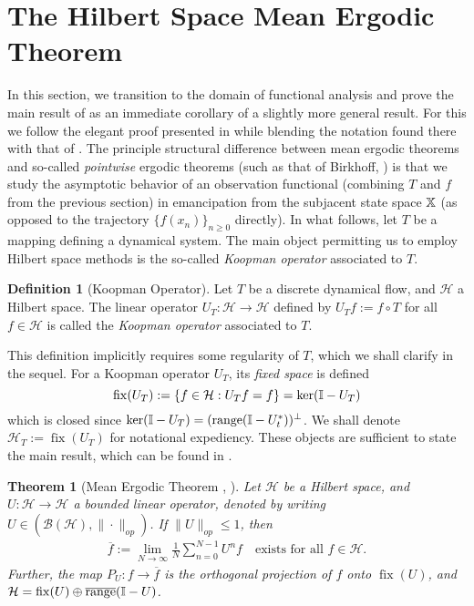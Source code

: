 \documentclass[11pt]{report}
\newcommand{\mc}[1]{\mathcal{#1}}
\DeclareMathOperator{\fix}{fix}
\DeclareMathOperator{\ran}{range}
\newtheorem{theorem}{Theorem}[section]
\theoremstyle{definition}
\newtheorem{definition}{Definition}
\begin{document}
    \section{The Hilbert Space Mean Ergodic Theorem}\label{sec2}
    In this section, we transition to the domain of functional analysis and
    prove the main result of \cite{Neumann_1932} as an immediate corollary of a
    slightly more general result. For this we follow the elegant proof presented
    in \cite[theorem 1.3.1]{Weber_2000} while blending the notation found there
    with that of \cite[ch.8]{Eisner_Farkas_Haase_Nagel_2015}. The principle
    structural difference between mean ergodic theorems and so-called
    \textit{pointwise} ergodic theorems (such as that of Birkhoff,
    \cite{Birkhoff_1931}) is that we study the asymptotic behavior of an
    observation functional (combining $T$ and $f$ from the previous section) in
    emancipation from the subjacent state space $\mathbb{X}$ (as opposed to the
    trajectory $\{f(x_n)\}_{n\geq 0}$ directly). In what follows, let $T$ be a
    mapping defining a dynamical system. The main object permitting us to employ
    Hilbert space methods is the so-called {\it Koopman operator} associated to
    $T$.
    \begin{definition}[Koopman Operator]\label{def1} Let $T$ be a discrete
        dynamical flow, and $\mc{H}$ a Hilbert space. The linear operator
        $U_T:\mc{H}\rightarrow \mc{H}$ defined by $U_Tf:=f\circ T$ for all $f\in
        \mc{H}$ is called the \textit{Koopman operator} associated to $T$.
    \end{definition}
    This definition implicitly requires some regularity of $T$, which we shall
    clarify in the sequel. For a Koopman operator $U_T$, its \textit{fixed
    space} is defined
    \[\fix(U_T):=\{f\in\mc{H}:U_Tf=f\}=\ker(\mbb{I}-U_T)\] which is closed since
    $\ker(\mbb{I}-U_T)=(\ran(\mbb{I}-U_t^\ast))^{\perp}$. We shall denote
    $\mc{H}_T:=\fix(U_T)$ for notational expediency. These objects are
    sufficient to state the main result, which can be found in \cite[theorem
    8.6]{Eisner_Farkas_Haase_Nagel_2015}.
    \begin{theorem}[Mean Ergodic Theorem {\cite[theorem
        8.6]{Eisner_Farkas_Haase_Nagel_2015}}, {\cite[theorem
        1.3.1]{Weber_2000}}]\label{thm1} Let $\mc{H}$ be a Hilbert space, and
        $U:\mc{H}\rightarrow\mc{H}$ a bounded linear operator, denoted by writing
        $U\in(\mc{B}(\mc{H}),\|\cdot\|_{op})$. If $\|U\|_{op}\leq 1$, then
        \begin{align*}
            \overline{f}:=\lim_{N\rightarrow\infty}\frac{1}{N}\sum_{n=0}^{N-1}U^nf\quad\text{exists for all $f\in\mc{H}$.}
        \end{align*}
        Further, the map $P_{U}:f\rightarrow\overline{f}$ is the orthogonal
        projection of $f$ onto $\fix(U)$, and
        $\mc{H}=\fix(U)\oplus\overline{\ran}(\mbb{I}-U)$.
    \end{theorem}
\end{document}
